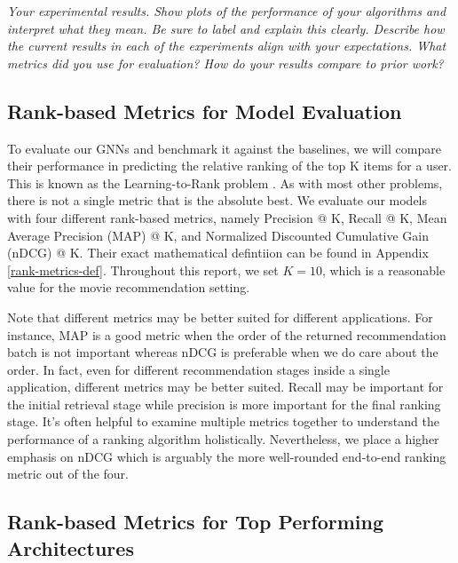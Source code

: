\documentclass{article}
\begin{document}
\textit{Your experimental results. Show plots of the performance of your algorithms and interpret what they mean. Be sure to label and explain this clearly. Describe how the current results in each of the experiments align with your expectations. What metrics did you use for evaluation? How do your results compare to prior work?}

\subsection{Rank-based Metrics for Model Evaluation} \label{metrics}


To evaluate our GNNs and benchmark it against the baselines, we will compare their performance in predicting the relative ranking of the top K items for a user. This is known as the Learning-to-Rank problem \cite{learning_to_rank}. As with most other problems, there is not a single metric that is the absolute best. We evaluate our models with four different rank-based metrics, namely Precision @ K, Recall @ K, Mean Average Precision (MAP) @ K, and Normalized Discounted Cumulative Gain (nDCG) @ K. Their exact mathematical defintiion can be found in Appendix \ref{rank-metrics-def}. Throughout this report, we set $K = 10$, which is a reasonable value for the movie recommendation setting.

Note that different metrics may be better suited for different applications. For instance, MAP is a good metric when the order of the returned recommendation batch is not important whereas nDCG is preferable when we do care about the order. In fact, even for different recommendation stages inside a single application, different metrics may be better suited. Recall may be important for the initial retrieval stage while precision is more important for the final ranking stage. It's often helpful to examine multiple metrics together to understand the performance of a ranking algorithm holistically. Nevertheless, we place a higher emphasis on nDCG which is arguably the more well-rounded end-to-end ranking metric out of the four.

\subsection{Rank-based Metrics for Top Performing Architectures}
\end{document}
